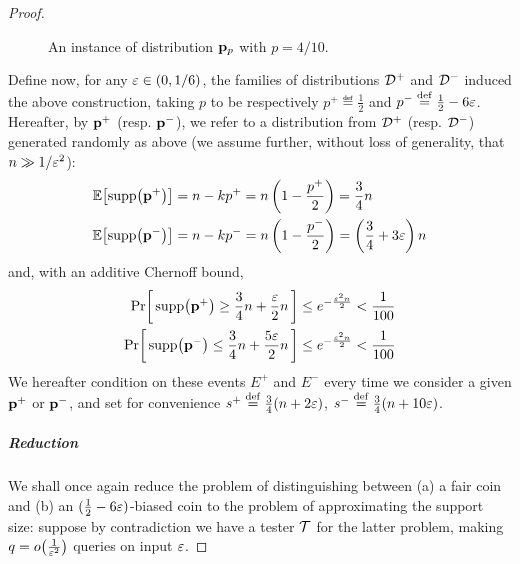 \begin{proof}
\begin{figure}[!ht]
\caption{\label{fig:construction:lb:support:size:D}An instance of distribution $\mathbf{p}_p$ with $p=4/10$.}
\end{figure}
Define now, for any $\varepsilon\in(0,1/6)$, the families of distributions $\mathcal{D}^+$ and $\mathcal{D}^-$ induced the above construction, taking $p$ to be respectively $p^+\eqdef \frac{1}{2}$ and $p^-\stackrel{\rm def}{=} \frac{1}{2}-6\varepsilon$. Hereafter, by $\mathbf{p}^+$ (resp. $\mathbf{p}^-$), we refer to a distribution from $\mathcal{D}^+$ (resp. $\mathcal{D}^-$) generated randomly as above (we assume further, without loss of generality, that $n\gg 1/\varepsilon^2$):
\begin{align*}
 \mathbb{E}\!\left[ \operatorname{supp}\!\left(\mathbf{p}^+\right) \right] &= n - kp^+ = n\left(1-\frac{p^+}{2}\right) = \frac{3}{4}n \\
 \mathbb{E}\!\left[ \operatorname{supp}\!\left(\mathbf{p}^{\vphantom{+}-}\right) \right] &= n - kp^- = n\left(1-\frac{p^-}{2}\right) = \left(\frac{3}{4}+3\varepsilon\right)n
\end{align*}
and, with an additive Chernoff bound,
\begin{align*}
 \Pr\!\left[\,  \operatorname{supp}\!\left(\mathbf{p}^+\right) \geq \frac{3}{4}n + \frac{\varepsilon}{2} n\, \right]  &\leq e^{ -\frac{\varepsilon^2 n}{2} } < \frac{1}{100} \\
 \Pr\!\left[\,  \operatorname{supp}\!\left(\mathbf{p}^-\right) \leq \frac{3}{4}n + \frac{5\varepsilon}{2} n\, \right] &\leq e^{ -\frac{\varepsilon^2 n}{2} } < \frac{1}{100}
\end{align*}
We hereafter condition on these events $E^+$ and $E^-$ every time we consider a given $\mathbf{p}^+$ or $\mathbf{p}^-$, and set for convenience $s^+\stackrel{\rm def}{=} \frac{3}{4}(n + 2\varepsilon)$, $s^-\stackrel{\rm def}{=} \frac{3}{4}(n + 10\varepsilon)$.

\subparagraph{Reduction}  We shall once again reduce the problem of distinguishing between \textsf{(a)} a fair coin and \textsf{(b)} an $(\frac{1}{2}-6\varepsilon)$-biased coin to the problem of approximating the support size: suppose by contradiction we have a tester $\mathcal{T}$ for the latter problem, making $q=\littleO{\frac{1}{\eps^2}}$ queries on input $\varepsilon$.


\end{proof}
